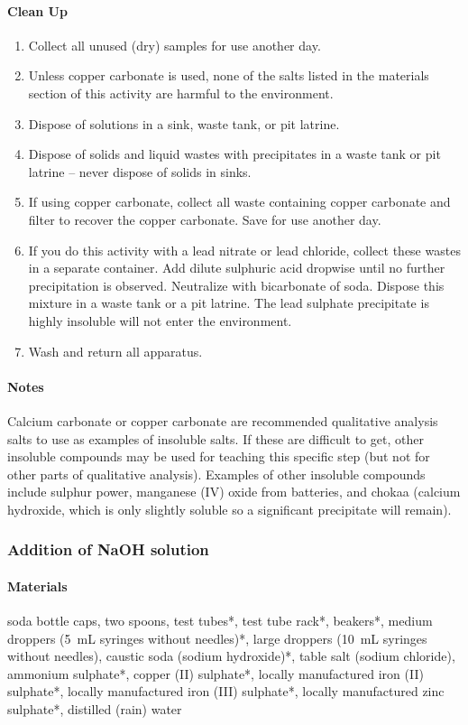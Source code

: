 \paragraph{Clean Up}
\begin{enumerate}
\item{Collect all unused (dry) samples for use another day.}
\item{Unless copper carbonate is used, none of the salts listed in the materials section of this activity are harmful to the environment.}
\item{Dispose of solutions in a sink, waste tank, or pit latrine.}
\item{Dispose of solids and liquid wastes with precipitates in a waste tank or pit latrine -- never dispose of solids in sinks.}
\item{If using copper carbonate, collect all waste containing copper carbonate and filter to recover the copper carbonate. Save for use another day.}
\item{If you do this activity with a lead nitrate or lead chloride, collect these wastes in a separate container. Add dilute sulphuric acid dropwise until no further precipitation is observed. Neutralize with bicarbonate of soda. Dispose this mixture in a waste tank or a pit latrine. The lead sulphate precipitate is highly insoluble will not enter the environment.}
\item{Wash and return all apparatus.}
\end{enumerate}

\paragraph{Notes}
Calcium carbonate or copper carbonate are recommended qualitative analysis salts to use as examples of insoluble salts. If these are difficult to get, other insoluble compounds may be used for teaching this specific step (but not for other parts of qualitative analysis). Examples of other insoluble compounds include sulphur power, manganese (IV) oxide from batteries, and chokaa (calcium hydroxide, which is only slightly soluble so a significant precipitate will remain).
\subsubsection{Addition of NaOH solution}

\paragraph{Materials}
soda bottle caps, two spoons, test tubes*, test tube rack*, beakers*, medium droppers (5~mL syringes without needles)*, large droppers (10~mL syringes without needles), caustic soda (sodium hydroxide)*, table salt (sodium chloride), ammonium sulphate*, copper (II) sulphate*, locally manufactured iron (II) sulphate*, locally manufactured iron (III) sulphate*, locally manufactured zinc sulphate*, distilled (rain) water

